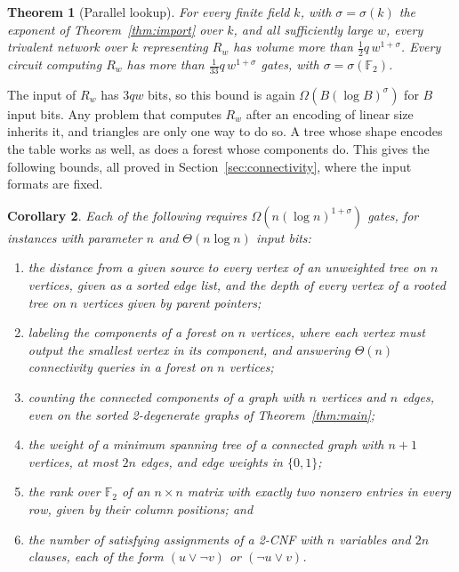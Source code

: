 \documentclass[11pt]{article}
\newtheorem{theorem}{Theorem}[section]
\newtheorem{corollary}[theorem]{Corollary}
\theoremstyle{definition}
\theoremstyle{remark}
\newcommand{\F}{\mathbb{F}}
\begin{document}
\begin{theorem}[Parallel lookup]\label{thm:lookup}
For every finite field $k$, with $\sigma=\sigma(k)$ the exponent of
Theorem~\ref{thm:import} over $k$, and all sufficiently large $w$, every
trivalent network over $k$ representing $R_w$ has volume more than
$\tfrac12q\,w^{1+\sigma}$. Every circuit computing $R_w$ has more than
$\tfrac1{33}q\,w^{1+\sigma}$ gates, with $\sigma=\sigma(\F_2)$.
\end{theorem}

The input of $R_w$ has $3qw$ bits, so this bound is again
$\Omega(B(\log B)^\sigma)$ for $B$ input bits. Any problem that computes
$R_w$ after an encoding of linear size inherits it, and triangles are only
one way to do so. A tree whose shape encodes the table works as well, as
does a forest whose components do. This gives the following bounds, all
proved in Section~\ref{sec:connectivity}, where the input formats are
fixed.

\begin{corollary}\label{cor:connectivity}
Each of the following requires $\Omega(n(\log n)^{1+\sigma})$ gates, for
instances with parameter $n$ and $\Theta(n\log n)$ input bits:
\begin{enumerate}
\item the distance from a given source to every vertex of an unweighted
tree on $n$ vertices, given as a sorted edge list, and the depth of every
vertex of a rooted tree on $n$ vertices given by parent pointers;
\item labeling the components of a forest on $n$ vertices, where each
vertex must output the smallest vertex in its component, and answering
$\Theta(n)$ connectivity queries in a forest on $n$ vertices;
\item counting the connected components of a graph with $n$ vertices and
$n$ edges, even on the sorted 2-degenerate graphs of
Theorem~\ref{thm:main};
\item the weight of a minimum spanning tree of a connected graph with
$n+1$ vertices, at most $2n$ edges, and edge weights in $\{0,1\}$;
\item the rank over $\F_2$ of an $n\times n$ matrix with exactly two
nonzero entries in every row, given by their column positions; and
\item the number of satisfying assignments of a 2-CNF with $n$ variables
and $2n$ clauses, each of the form $(u\lor\neg v)$ or $(\neg u\lor v)$.
\end{enumerate}
\end{corollary}
\end{document}

